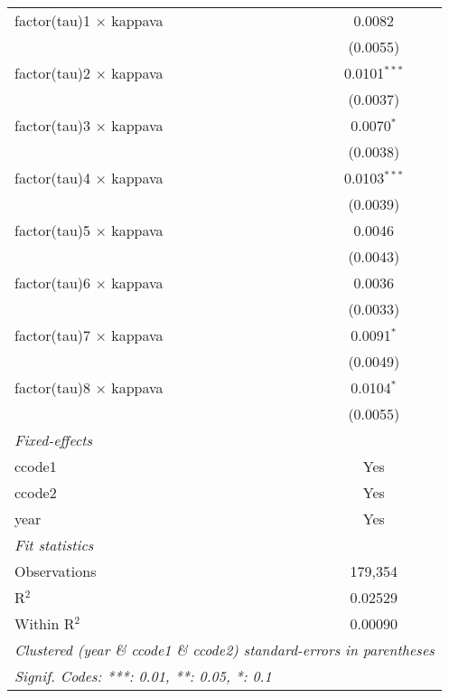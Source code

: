 \begin{tabular}{lc}
   factor(tau)1 $\times$ kappava   & 0.0082\\   
                                   & (0.0055)\\   
   factor(tau)2 $\times$ kappava   & 0.0101$^{***}$\\   
                                   & (0.0037)\\   
   factor(tau)3 $\times$ kappava   & 0.0070$^{*}$\\   
                                   & (0.0038)\\   
   factor(tau)4 $\times$ kappava   & 0.0103$^{***}$\\   
                                   & (0.0039)\\   
   factor(tau)5 $\times$ kappava   & 0.0046\\   
                                   & (0.0043)\\   
   factor(tau)6 $\times$ kappava   & 0.0036\\   
                                   & (0.0033)\\   
   factor(tau)7 $\times$ kappava   & 0.0091$^{*}$\\   
                                   & (0.0049)\\   
   factor(tau)8 $\times$ kappava   & 0.0104$^{*}$\\   
                                   & (0.0055)\\   
   \midrule
   \emph{Fixed-effects}\\
   ccode1                          & Yes\\  
   ccode2                          & Yes\\  
   year                            & Yes\\  
   \midrule
   \emph{Fit statistics}\\
   Observations                    & 179,354\\  
   R$^2$                           & 0.02529\\  
   Within R$^2$                    & 0.00090\\  
   \midrule \midrule
   \multicolumn{2}{l}{\emph{Clustered (year \& ccode1 \& ccode2) standard-errors in parentheses}}\\
   \multicolumn{2}{l}{\emph{Signif. Codes: ***: 0.01, **: 0.05, *: 0.1}}\\
\end{tabular}
\par\endgroup



